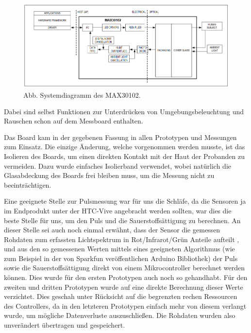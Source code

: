 \begin{figure}[H] \centering
\includegraphics[width=\textwidth]{Images/Systemdiagramm.png} 
\vspace{-0.3cm} 
\caption{Abb.  Systemdiagramm des MAX30102.}
\label{fig-elise} 
\end{figure}

Dabei sind selbst Funktionen zur Unterdrücken von Umgebungsbeleuchtung und Rauschen schon auf dem Messboard enthalten.

Das Board kam in der gegebenen Fassung in allen Prototypen und Messungen zum Einsatz. Die einzige Änderung, welche vorgenommen werden musste, ist das Isolieren des Boards, um einen direkten Kontakt mit der Haut der Probanden zu vermeiden. Dazu wurde einfaches Isolierband verwendet, wobei natürlich die Glasabdeckung des Boards frei bleiben muss, um die Messung nicht zu beeinträchtigen.

Eine geeignete Stelle zur Pulsmessung war für uns die Schläfe, da die Sensoren ja im Endprodukt unter der HTC-Vive angebracht werden sollten, war dies die beste Stelle für uns, um den Puls und die Sauerstoffsättigung zu berechnen. An dieser Stelle sei auch noch einmal erwähnt, dass der Sensor die gemessen Rohdaten zum erfassten Lichtspektrum in Rot/Infrarot/Grün Anteile aufteilt , und aus den so gemessenen Werten mittels eines geeigneten Algorithmus (wie zum Beispiel in der von Sparkfun veröffentlichen Arduino Bibliothek) der Puls sowie die Sauerstoffsättigung direkt von einem Mikrocontroller berechnet werden können. Dies wurde für den ersten Prototypen auch noch so gehandhabt. Für den zweiten und dritten Prototypen wurde auf eine direkte Berechnung dieser Werte verzichtet. Dies geschah unter Rücksicht auf die begrenzten rechen Ressourcen des Controllers, da in den letzteren Prototypen einfach mehr von diesem verlangt wurde, um mögliche Datenverluste auszuschließen. Die Rohdaten wurden also unverändert übertragen und gespeichert.

